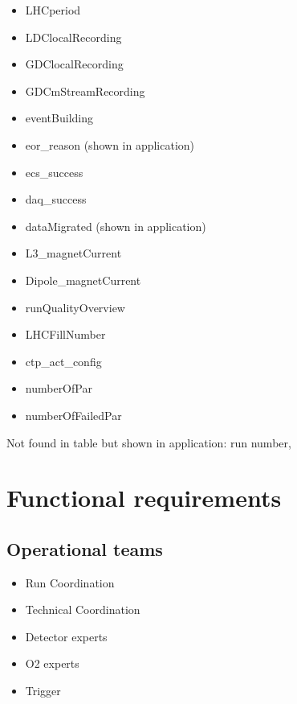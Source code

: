 \begin{itemize}
  \item LHCperiod	
  \item LDClocalRecording	
  \item GDClocalRecording	
  \item GDCmStreamRecording	
  \item eventBuilding	
  \item eor\_reason (shown in application)
  \item ecs\_success	
  \item daq\_success	
  \item dataMigrated (shown in application)
  \item L3\_magnetCurrent	
  \item Dipole\_magnetCurrent	
  \item runQualityOverview	
  \item LHCFillNumber	
  \item ctp\_act\_config	
  \item numberOfPar	
  \item numberOfFailedPar
\end{itemize}
Not found in table but shown in application: run number, 


\section{Functional requirements}

\subsection{Operational teams}
\begin{itemize}
  \item Run Coordination
  \item Technical Coordination
  \item Detector experts
  \item O2 experts
  \item Trigger
\end{itemize}

